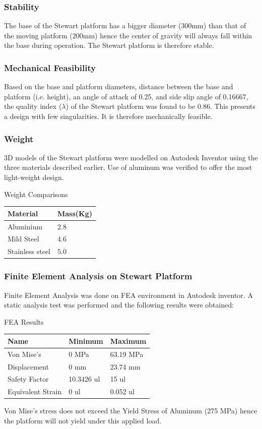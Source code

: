 \subsubsection{Stability}
The base of the Stewart platform has a bigger diameter (300mm) than that of the moving platform (200mm) hence the center of gravity will always fall within the base during operation. The Stewart platform is therefore stable.
\subsubsection{Mechanical Feasibility}
Based on the base and platform diameters, distance between the base and platform (i.e. height), an angle of attack of 0.25, and side slip angle of 0.16667, the quality index ($\lambda$) of the Stewart platform was found to be 0.86. This presents a design with few singularities. It is therefore mechanically feasible.
\subsubsection{Weight}
3D models of the Stewart platform were modelled on Autodesk Inventor using the three materials described earlier. Use of aluminum was verified to offer the most light-weight design.
\begin{table}[H]
\caption{Weight Comparisons}
\end{table}
\begin{center}
\begin{tabular}{|l|l|}
\hline
\textbf{Material} & \textbf{Mass(Kg)}\\
\hline
Aluminium & 2.8\\
\hline
Mild Steel & 4.6\\
\hline
Stainless steel & 5.0 \\
\hline
\end{tabular}
\end{center}
\subsubsection{Finite Element Analysis on Stewart Platform}
Finite Element Analysis was done on FEA environment in Autodesk inventor. A static analysis test was performed and the following results were obtained:
\begin{table}[H]
\caption{FEA Results}
\end{table}
\begin{center}
\begin{tabular}{|l|l|l|}
\hline
\textbf{Name} & \textbf{Minimum} & \textbf{Maximum}\\
\hline
Von Mise's & 0 MPa & 63.19 MPa\\
\hline
Displacement & 0 mm & 23.74 mm\\
\hline
Safety Factor & 10.3426 ul & 15 ul\\
\hline
Equivalent Strain & 0 ul & 0.052 ul\\
\hline
\end{tabular}
\end{center}
Von Mise's stress does not exceed the Yield Stress of Aluminum (275 MPa) hence the platform will not yield under this applied load.

